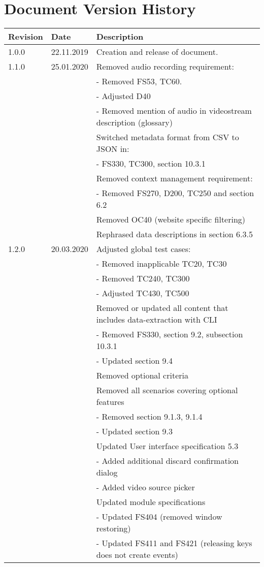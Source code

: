 \chapter*{Document Version History}
\label{ch:versionhistory}
\begin{table}[h]
\begin{tabular}{lll}
\textbf{Revision} & \textbf{Date} & \textbf{Description}              \\
\hline
1.0.0             & 22.11.2019    & Creation and release of document. \\
\hline
1.1.0             & 25.01.2020    & Removed audio recording requirement: \\
&& - Removed FS53, TC60. \\
&& - Adjusted D40 \\
&& - Removed mention of audio in \gls{videostream} description (glossary) \\
&& Switched metadata format from CSV to JSON in:\\
&& - FS330, TC300, section 10.3.1 \\
&& Removed context management requirement:\\
&& - Removed FS270, D200, TC250 and section 6.2\\
&& Removed OC40 (website specific filtering)\\
&& Rephrased data descriptions in section 6.3.5\\
\hline
1.2.0           & 20.03.2020    & Adjusted global test cases: \\
&& - Removed inapplicable TC20, TC30\\
&& - Removed TC240, TC300\\
&& - Adjusted TC430, TC500\\
&& Removed or updated all content that includes data-extraction with CLI\\
&& - Removed FS330, section 9.2, subsection 10.3.1\\
&& - Updated section 9.4\\
&& Removed optional criteria\\
&& Removed all scenarios covering optional features\\
&& - Removed section 9.1.3, 9.1.4\\
&& - Updated section 9.3\\
&& Updated User interface specification 5.3\\
&& - Added additional discard confirmation dialog\\
&& - Added video source picker\\
&& Updated module specifications\\
&& - Updated FS404 (removed window restoring)\\
&& - Updated FS411 and FS421 (releasing keys does not create events)
\end{tabular}
\end{table}